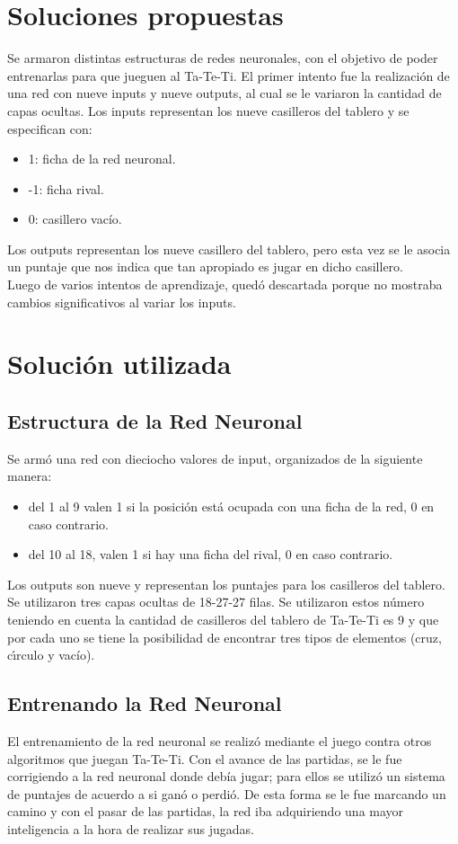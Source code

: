 \documentclass[12pt,titlepage]{article}
\begin{document}
\section{Soluciones propuestas}
Se armaron distintas estructuras de redes neuronales, con el objetivo de poder entrenarlas para que jueguen al Ta-Te-Ti. El primer intento fue la realizaci\'on de una red con nueve inputs y nueve outputs, al cual se le variaron la cantidad de capas ocultas. Los inputs representan los nueve casilleros del tablero y se especifican con:
\begin{itemize}
 \item 1: ficha de la red neuronal.
 \item -1: ficha rival.
 \item 0: casillero vac\'io.
\end{itemize}
Los outputs representan los nueve casillero del tablero, pero esta vez se le asocia un puntaje que nos indica que tan apropiado es jugar en dicho casillero. \\
Luego de varios intentos de aprendizaje, qued\'o descartada porque no mostraba cambios significativos al variar los inputs. 

\section{Soluci\'on utilizada}
\subsection{Estructura de la Red Neuronal}
Se arm\'o una red con dieciocho valores de input, organizados de la siguiente manera:
\begin{itemize}
 \item del 1 al 9 valen 1 si la posición está ocupada con una ficha de la red, 0 en caso contrario.
 \item del 10 al 18, valen 1 si hay una ficha del rival, 0 en caso contrario.
\end{itemize}
Los outputs son nueve y representan los puntajes para los casilleros del tablero. Se utilizaron tres capas ocultas de 18-27-27 filas. Se utilizaron estos n\'umero teniendo en cuenta la cantidad de casilleros del tablero de Ta-Te-Ti es 9 y que por cada uno se tiene la posibilidad de encontrar tres tipos de elementos (cruz, c\'ırculo y vac\'io).

\subsection{Entrenando la Red Neuronal}
El entrenamiento de la red neuronal se realiz\'o mediante el juego contra otros algoritmos que juegan Ta-Te-Ti. Con el avance de las partidas, se le fue corrigiendo a la red neuronal donde deb\'ia jugar; para ellos se utiliz\'o un sistema de puntajes de acuerdo a si gan\'o o perdi\'o. De esta forma se le fue marcando un camino y con el pasar de las partidas, la red iba adquiriendo una mayor inteligencia a la hora de realizar sus jugadas.
\end{document}
